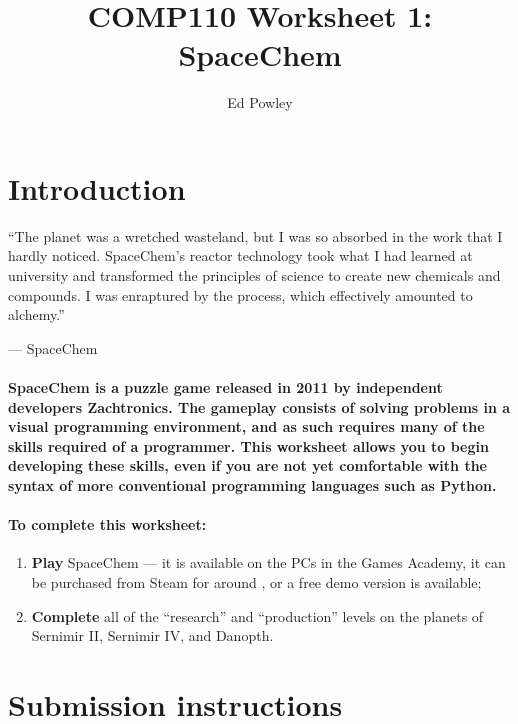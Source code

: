 \documentclass{../../../fal_assignment}
\title{COMP110 Worksheet 1: SpaceChem}
\author{Ed Powley}
\begin{document}
\maketitle

\section*{Introduction}

\begin{marginquote}
``The planet was a wretched wasteland, but I was so absorbed in the work that I hardly noticed. SpaceChem's reactor technology took what I had learned at university and transformed the principles of science to create new chemicals and compounds. I was enraptured by the process, which effectively amounted to alchemy.''

--- SpaceChem
\end{marginquote}

\paragraph{
\textbf{SpaceChem} is a puzzle game released in 2011 by independent developers Zachtronics. The gameplay consists of solving problems in a visual programming environment, and as such requires many of the skills required of a programmer. This worksheet allows you to begin developing these skills, even if you are not yet comfortable with the syntax of more conventional programming languages such as Python.
}

\paragraph{
To complete this worksheet:
}
\begin{enumerate}[label=(\alph*)]
	\item \textbf{Play} SpaceChem --- it is available on the PCs in the Games Academy,
        it can be purchased from Steam for around ,
        or a free demo version is available;
 	\item \textbf{Complete} all of the ``research'' and ``production'' levels on the planets of Sernimir II, Sernimir IV, and Danopth.
\end{enumerate}

\section*{Submission instructions}
\end{document}
